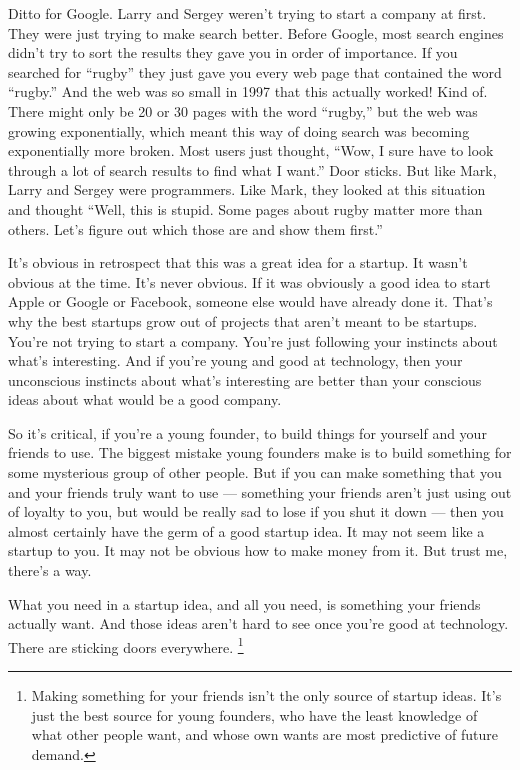 Ditto for Google. Larry and Sergey weren't trying to start a company at
first. They were just trying to make search better. Before Google, most
search engines didn't try to sort the results they gave you in order of
importance. If you searched for ``rugby'' they just gave you every web
page that contained the word ``rugby.'' And the web was so small in 1997
that this actually worked! Kind of. There might only be 20 or 30 pages
with the word ``rugby,'' but the web was growing exponentially, which
meant this way of doing search was becoming exponentially more broken.
Most users just thought, ``Wow, I sure have to look through a lot of
search results to find what I want.'' Door sticks. But like Mark, Larry
and Sergey were programmers. Like Mark, they looked at this situation
and thought ``Well, this is stupid. Some pages about rugby matter more
than others. Let's figure out which those are and show them first.''

It's obvious in retrospect that this was a great idea for a startup. It
wasn't obvious at the time. It's never obvious. If it was obviously a
good idea to start Apple or Google or Facebook, someone else would have
already done it. That's why the best startups grow out of projects that
aren't meant to be startups. You're not trying to start a company.
You're just following your instincts about what's interesting. And if
you're young and good at technology, then your unconscious instincts
about what's interesting are better than your conscious ideas about what
would be a good company.

So it's critical, if you're a young founder, to build things for
yourself and your friends to use. The biggest mistake young founders
make is to build something for some mysterious group of other people.
But if you can make something that you and your friends truly want to
use --- something your friends aren't just using out of loyalty to you,
but would be really sad to lose if you shut it down --- then you almost
certainly have the germ of a good startup idea. It may not seem like a
startup to you. It may not be obvious how to make money from it. But
trust me, there's a way.

What you need in a startup idea, and all you need, is something your
friends actually want. And those ideas aren't hard to see once you're
good at technology. There are sticking doors everywhere.
\footnote{Making something for your friends isn't the only source of
startup ideas. It's just the best source for young founders, who have
the least knowledge of what other people want, and whose own wants are
most predictive of future demand.}

